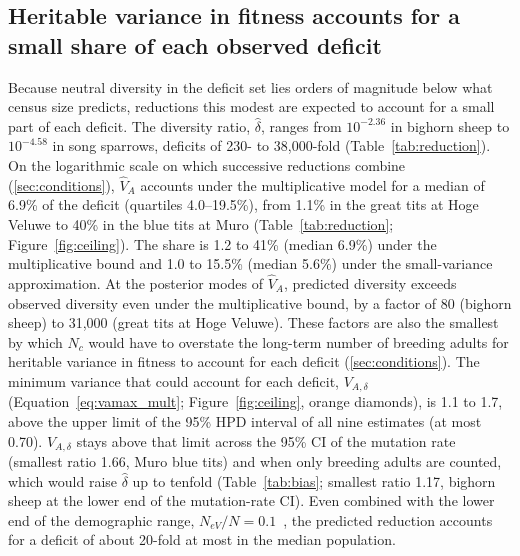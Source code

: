 \documentclass{article}
\begin{document}
\subsection{Heritable variance in fitness accounts for a small share of each observed deficit}\label{sec:res_deficit}
Because neutral diversity in the deficit set lies orders of magnitude below what census size predicts, reductions this modest are expected to account for a small part of each deficit. The diversity ratio, $\hat{\delta}$, ranges from $10^{-2.36}$ in bighorn sheep to $10^{-4.58}$ in song sparrows, deficits of 230- to 38,000-fold (Table~\ref{tab:reduction}). On the logarithmic scale on which successive reductions combine (\autoref{sec:conditions}), $\hat{V}_A$ accounts under the multiplicative model for a median of 6.9\% of the deficit (quartiles 4.0--19.5\%), from 1.1\% in the great tits at Hoge Veluwe to 40\% in the blue tits at Muro (Table~\ref{tab:reduction}; Figure~\ref{fig:ceiling}). The share is 1.2 to 41\% (median 6.9\%) under the multiplicative bound and 1.0 to 15.5\% (median 5.6\%) under the small-variance approximation. At the posterior modes of $\hat{V}_A$, predicted diversity exceeds observed diversity even under the multiplicative bound, by a factor of 80 (bighorn sheep) to 31,000 (great tits at Hoge Veluwe). These factors are also the smallest by which $N_c$ would have to overstate the long-term number of breeding adults for heritable variance in fitness to account for each deficit (\autoref{sec:conditions}). The minimum variance that could account for each deficit, $V_{A,\delta}$ (Equation~\eqref{eq:vamax_mult}; Figure~\ref{fig:ceiling}, orange diamonds), is 1.1 to 1.7, above the upper limit of the 95\% HPD interval of all nine estimates (at most 0.70). $V_{A,\delta}$ stays above that limit across the 95\% CI of the mutation rate (smallest ratio 1.66, Muro blue tits) and when only breeding adults are counted, which would raise $\hat{\delta}$ up to tenfold (Table~\ref{tab:bias}; smallest ratio 1.17, bighorn sheep at the lower end of the mutation-rate CI). Even combined with the lower end of the demographic range, $N_{eV}/N = 0.1$~\cite{frankham1995}, the predicted reduction accounts for a deficit of about 20-fold at most in the median population.
\end{document}
